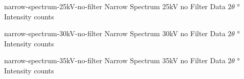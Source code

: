 \documentclass{WitsPhysicsReport}
\begin{document}
                                      {narrow-spectrum-25kV-no-filter} %
                                      {Narrow Spectrum 25kV no Filter} %
                                      {Data} %
                                      {$2 \theta$} %
                                      {\si{\degree}} %
                                      {Intensity} %
                                      {counts} %
                                      {%
                                      }


                                      {narrow-spectrum-30kV-no-filter} %
                                      {Narrow Spectrum 30kV no Filter} %
                                      {Data} %
                                      {$2 \theta$} %
                                      {\si{\degree}} %
                                      {Intensity} %
                                      {counts} %
                                      {%
                                      }

\lipsum[13]

                                      {narrow-spectrum-35kV-no-filter} %
                                      {Narrow Spectrum 35kV no Filter} %
                                      {Data} %
                                      {$2 \theta$} %
                                      {\si{\degree}} %
                                      {Intensity} %
                                      {counts} %
                                      {%
                                      }
\end{document}
